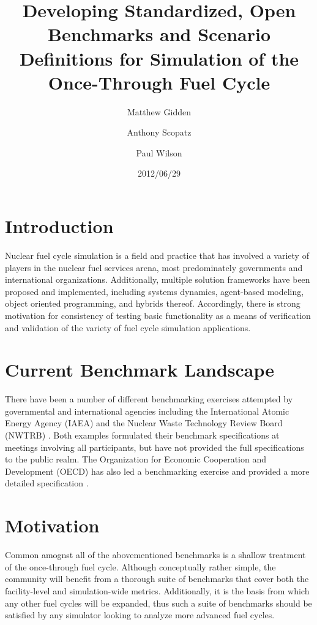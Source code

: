 \documentclass{anstrans}
\title{Developing Standardized, Open Benchmarks and Scenario 
Definitions for Simulation of the Once-Through Fuel Cycle}
\author[*]{Matthew Gidden}
\author[$\dag$]{Anthony Scopatz}
\author[*]{Paul Wilson}
\affil[*]{Department of Nuclear Engineering \& Engineering Physics, 
University of Wisconsin - Madison, Madison, WI, 53703}
\affil[$\dag$]{The Flash Center for Computational Science, University 
of Chicago, Chicago, IL, 60637}
\date{2012/06/29}
\begin{document}
\section{Introduction}
Nuclear fuel cycle simulation is a field and practice that has 
involved a variety of players in the nuclear fuel services arena, most
predominately governments and international organizations. 
Additionally, multiple solution frameworks have been proposed and 
implemented, including systems dynamics, agent-based modeling, object 
oriented programming, and hybrids thereof. Accordingly, there is 
strong motivation for consistency of testing basic functionality as a
means of verification and validation of the variety of fuel cycle
simulation applications.

\section{Current Benchmark Landscape}
There have been a number of different benchmarking exercises attempted
by governmental and international agencies including the International
Atomic Energy Agency (IAEA) \cite{_international_2011} and the
Nuclear Waste Technology Review Board (NWTRB) \cite{_nuclear_2011}.
Both examples formulated their benchmark specifications at meetings
involving all participants, but have not provided the full 
specifications to the public realm. The Organization for Economic 
Cooperation and Development (OECD) has also led a benchmarking 
exercise \cite{boucher_benchmark_2012} and provided a more detailed
specification \cite{boucher_specification_2008}.

\section{Motivation}
Common amognst all of the abovementioned benchmarks is a shallow
treatment of the once-through fuel cycle. Although conceptually 
rather simple, the community will benefit from a thorough suite of 
benchmarks that cover both the facility-level and simulation-wide 
metrics. Additionally, it is the basis from which any other fuel 
cycles will be expanded, thus such a suite of benchmarks should be 
satisfied by any simulator looking to analyze more advanced fuel 
cycles.
\end{document}

